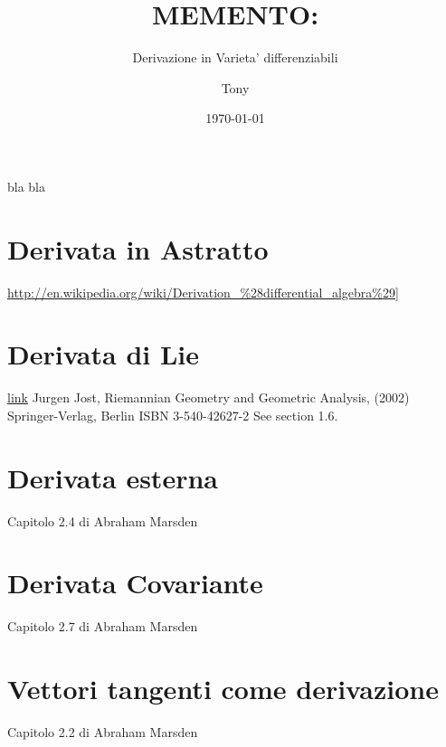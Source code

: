 \documentclass[a4paper,12pt]{scrartcl}    %
\begin{document}
	\title{MEMENTO:}
	\subtitle{Derivazione in Varieta' differenziabili}
	\author{Tony}
	\date{\today}
\maketitle

bla bla

\tableofcontents

\section{Derivata in Astratto}
\url{http://en.wikipedia.org/wiki/Derivation_%28differential_algebra%29]}

\section{Derivata di Lie}
\href{run:d:~/Downloads/FoM2.pdf}{link}
Jurgen Jost, Riemannian Geometry and Geometric Analysis, (2002) Springer-Verlag, Berlin ISBN 3-540-42627-2 See section 1.6.


\section{Derivata esterna}
Capitolo 2.4 di Abraham Marsden

\section{Derivata Covariante}
Capitolo 2.7 di Abraham Marsden

\section{Vettori tangenti come derivazione}
Capitolo 2.2 di Abraham Marsden
\end{document}
